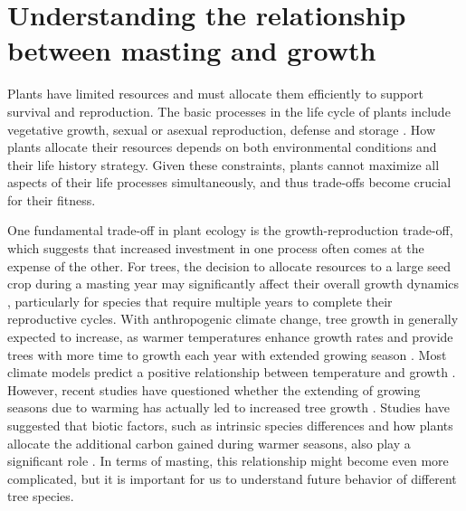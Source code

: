 \documentclass[11pt,letter]{article}
\begin{document}
\section{Understanding the relationship between masting and growth}
Plants have limited resources and must allocate them efficiently to support survival and reproduction. The basic processes in the life cycle of plants include vegetative growth, sexual or asexual reproduction, defense and storage \citep{bazzaz1997plant}. How plants allocate their resources depends on both environmental conditions and their life history strategy. Given these constraints, plants cannot maximize all aspects of their life processes simultaneously, and thus trade-offs become crucial for their fitness.\par
One fundamental trade-off in plant ecology is the growth-reproduction trade-off, which suggests that increased investment in one process often comes at the expense of the other\citep{stearns1998evolution}. For trees, the decision to allocate resources to a large seed crop during a masting year may significantly affect their overall growth dynamics \citep{hacket2016tree}, particularly for species that require multiple years to complete their reproductive cycles. With anthropogenic climate change, tree growth in generally expected to increase, as warmer temperatures enhance growth rates and provide trees with more time to growth each year with extended growing season \citep{keenan2014net, finzi2020carbon}. Most climate models predict a positive relationship between temperature and growth \citep{ito2020global, friedlingstein2022global}. However, recent studies have questioned whether the extending of growing seasons due to warming has actually led to increased tree growth \citep{dow2022warm, green2022limits}.  Studies have suggested that biotic factors, such as intrinsic species differences and how plants allocate the additional carbon gained during warmer seasons, also play a significant role \citep{hacket2016consistent}. In terms of masting, this relationship might become even more complicated, but it is important for us to understand future behavior of different tree species.\par
\end{document}
